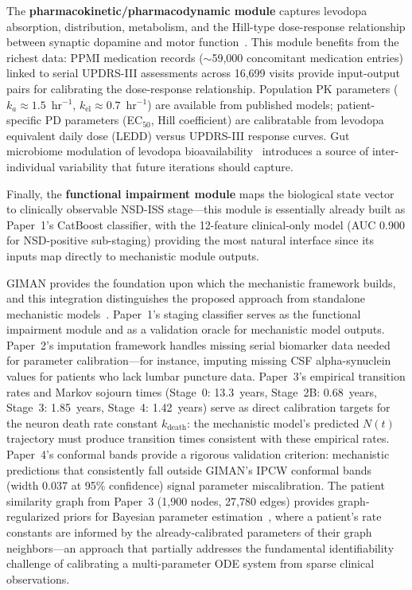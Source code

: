 The \textbf{pharmacokinetic/pharmacodynamic module} captures levodopa absorption, distribution, metabolism, and the Hill-type dose-response relationship between synaptic dopamine and motor function~\cite{ursino2020}. This module benefits from the richest data: PPMI medication records ($\sim$59,000 concomitant medication entries) linked to serial UPDRS-III assessments across 16,699 visits provide input-output pairs for calibrating the dose-response relationship. Population PK parameters ($k_a \approx 1.5$~hr$^{-1}$, $k_\text{el} \approx 0.7$~hr$^{-1}$) are available from published models; patient-specific PD parameters (EC$_{50}$, Hill coefficient) are calibratable from levodopa equivalent daily dose (LEDD) versus UPDRS-III response curves. Gut microbiome modulation of levodopa bioavailability~\cite{vankessel2019} introduces a source of inter-individual variability that future iterations should capture.

Finally, the \textbf{functional impairment module} maps the biological state vector to clinically observable NSD-ISS stage---this module is essentially already built as Paper~1's CatBoost classifier, with the 12-feature clinical-only model (AUC 0.900 for NSD-positive sub-staging) providing the most natural interface since its inputs map directly to mechanistic module outputs.

GIMAN provides the foundation upon which the mechanistic framework builds, and this integration distinguishes the proposed approach from standalone mechanistic models~\cite{bjornsson2020,laubenbacher2024}. Paper~1's staging classifier serves as the functional impairment module and as a validation oracle for mechanistic model outputs. Paper~2's imputation framework handles missing serial biomarker data needed for parameter calibration---for instance, imputing missing CSF alpha-synuclein values for patients who lack lumbar puncture data. Paper~3's empirical transition rates and Markov sojourn times (Stage~0: 13.3~years, Stage~2B: 0.68~years, Stage~3: 1.85~years, Stage~4: 1.42~years) serve as direct calibration targets for the neuron death rate constant $k_\text{death}$: the mechanistic model's predicted $N(t)$ trajectory must produce transition times consistent with these empirical rates. Paper~4's conformal bands provide a rigorous validation criterion: mechanistic predictions that consistently fall outside GIMAN's IPCW conformal bands (width 0.037 at 95\% confidence) signal parameter miscalibration. The patient similarity graph from Paper~3 (1,900 nodes, 27,780 edges) provides graph-regularized priors for Bayesian parameter estimation~\cite{villaverde2022}, where a patient's rate constants are informed by the already-calibrated parameters of their graph neighbors---an approach that partially addresses the fundamental identifiability challenge of calibrating a multi-parameter ODE system from sparse clinical observations.

